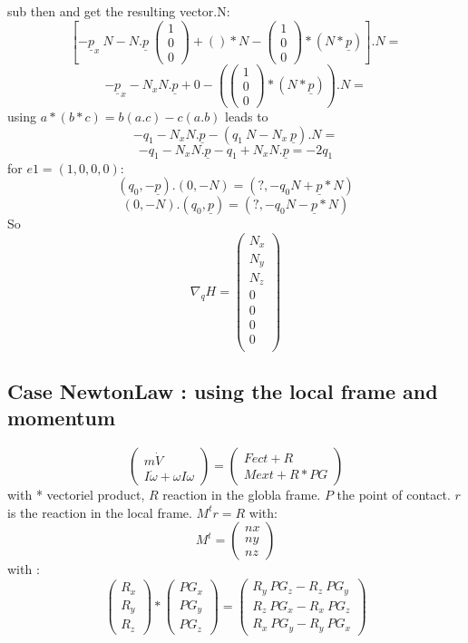 sub then and get the resulting vector.N:
\[\left[ -\underline p_x~N -N.\underline p~\left(\begin{array}{c}1\\0\\0\end{array}\right)+()*N-\left(\begin{array}{c}1\\0\\0\end{array}\right)*(N*\underline p)\right].N=\]
\[-\underline p_x-N_xN.\underline p+0-(\left(\begin{array}{c}1\\0\\0\end{array}\right)*(N*\underline p)).N=\]
  using $a*(b*c)=b(a.c)-c(a.b)$ leads to
  \[-q_1-N_xN.\underline p-(q_1~N-N_x~\underline p).N=\]
\[-q_1-N_xN.\underline p-q_1+N_xN.\underline p=-2q_1\]
for $e1=(1,0,0,0)$:
\[(q_0,-\underline p).(0,-N)=(?,-q_0N+\underline p*N)\]
\[(0,-N).(q_0,\underline p)=(?,-q_0N-\underline p*N)\]
So
\[\nabla _q H =\left(\begin{array}{c} N_x\\N_y\\N_z\\
0\\
0\\
0\\
0\\
\end{array}\right)\]


\subsection{Case NewtonLaw : using the local frame and momentum}

\[\left(\begin{array}{c}m \dot V\\I \dot \omega + \omega I \omega \end{array}\right)= \left(\begin{array}{c}Fect+R\\Mext + R*PG \end{array}\right)\]
  with * vectoriel product, $R$ reaction in the globla frame. $P$ the point of contact.
  $r$ is the reaction in the local frame.  $M^t r=R$ with:
  \[M^t=\left(\begin{array}{c} nx \\ny\\nz \end{array}\right)\]
  with :
  \[\left(\begin{array}{c} R_x \\R_y\\R_z \end{array}\right)*\left(\begin{array}{c} PG_x \\PG_y\\PG_z \end{array}\right) =\left(\begin{array}{c} R_y~PG_z - R_z~PG_y \\R_z~PG_x-R_x~PG_z \\R_x~PG_y-R_y~PG_x \end{array}\right)\]

